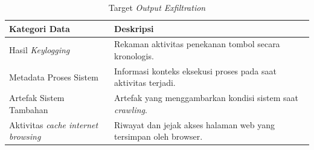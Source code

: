 \begin{table}[H]
\captionsetup{justification=raggedright,singlelinecheck=false}
\caption{Target \textit{Output Exfiltration}}
\label{tbl:target-eksfiltrasi}

\raggedright
\begin{tabular}{|p{5cm}|p{7.9cm}|}
\hline
\textbf{Kategori Data} & \textbf{Deskripsi} \\
\hline

Hasil \textit{Keylogging} &
Rekaman aktivitas penekanan tombol secara kronologis. \\
\hline

Metadata Proses Sistem &
Informasi konteks eksekusi proses pada saat aktivitas terjadi. \\
\hline

Artefak Sistem Tambahan &
Artefak yang menggambarkan kondisi sistem saat \textit{crawling}. \\
\hline

Aktivitas \textit{cache internet browsing} &
Riwayat dan jejak akses halaman web yang tersimpan oleh browser. \\
\hline
\end{tabular}
\end{table}
